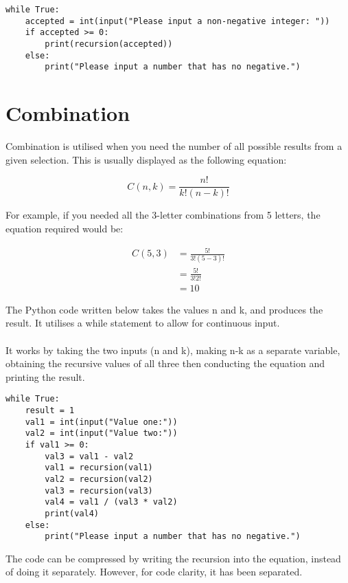 \documentclass{article}
\begin{document}
	\begin{verbatim}
while True:
	accepted = int(input("Please input a non-negative integer: "))
	if accepted >= 0:
		print(recursion(accepted))
	else:
		print("Please input a number that has no negative.")
	\end{verbatim}
	
	\section{Combination}
	
	Combination is utilised when you need the number of all possible
	results from a given selection. This is usually displayed as the following equation:

	\begin{equation*}
	C(n,k) = \frac{n!}{k!(n-k)!}
	\end{equation*}
	
	For example, if you needed all the 3-letter combinations from 5 letters, the
	equation required would be:
	
	\begin{align*}
	C(5,3) & = \frac{5!}{3!(5-3)!}\\
	& = \frac{5!}{3!2!}\\
	& = 10
	\end{align*}
	
	The Python code written below takes the values n and k, and produces
	the result. It utilises a while statement to allow for continuous input.
	
	\paragraph{}
	It works by taking the two inputs (n and k), making n-k as a separate variable,
	obtaining the recursive values of all three then conducting the equation and printing
	the result.
	
	
	\begin{verbatim}
while True:
	result = 1
	val1 = int(input("Value one:"))
	val2 = int(input("Value two:"))
	if val1 >= 0:
		val3 = val1 - val2
		val1 = recursion(val1)
		val2 = recursion(val2)
		val3 = recursion(val3)
		val4 = val1 / (val3 * val2)
		print(val4)
	else:
		print("Please input a number that has no negative.")
	\end{verbatim}
	
	The code can be compressed by writing the recursion into the equation, instead of doing it separately.
	However, for code clarity, it has been separated.
	
\end{document}
